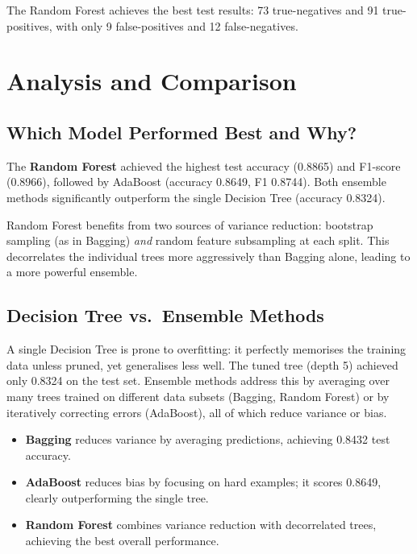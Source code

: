 \documentclass[12pt,a4paper]{article}
\begin{document}
The Random Forest achieves the best test results: 73 true-negatives and
91 true-positives, with only 9 false-positives and 12 false-negatives.

\section{Analysis and Comparison}

\subsection{Which Model Performed Best and Why?}

The \textbf{Random Forest} achieved the highest test accuracy (0.8865) and F1-score
(0.8966), followed by AdaBoost (accuracy 0.8649, F1 0.8744). Both ensemble methods
significantly outperform the single Decision Tree (accuracy 0.8324).

Random Forest benefits from two sources of variance reduction: bootstrap sampling
(as in Bagging) \emph{and} random feature subsampling at each split. This decorrelates
the individual trees more aggressively than Bagging alone, leading to a more powerful
ensemble.

\subsection{Decision Tree vs.\ Ensemble Methods}

A single Decision Tree is prone to overfitting: it perfectly memorises the training data
unless pruned, yet generalises less well. The tuned tree (depth 5) achieved only 0.8324
on the test set. Ensemble methods address this by averaging over many trees trained on
different data subsets (Bagging, Random Forest) or by iteratively correcting errors
(AdaBoost), all of which reduce variance or bias.

\begin{itemize}
  \item \textbf{Bagging} reduces variance by averaging predictions, achieving 0.8432 test accuracy.
  \item \textbf{AdaBoost} reduces bias by focusing on hard examples; it scores 0.8649,
        clearly outperforming the single tree.
  \item \textbf{Random Forest} combines variance reduction with decorrelated trees,
        achieving the best overall performance.
\end{itemize}
\end{document}

